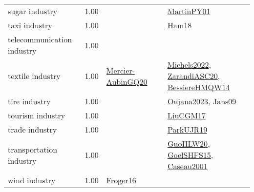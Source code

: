 {\begin{longtable}{p{3cm}r>{\raggedright\arraybackslash}p{6cm}>{\raggedright\arraybackslash}p{6cm}>{\raggedright\arraybackslash}p{8cm}}
\index{sugar industry}\index{Industries!sugar industry}sugar industry &  1.00 &  &  & \hyperref[detail:MartinPY01]{MartinPY01}\\
\index{taxi industry}\index{Industries!taxi industry}taxi industry &  1.00 &  &  & \hyperref[detail:Ham18]{Ham18}\\
\index{telecommunication industry}\index{Industries!telecommunication industry}telecommunication industry &  1.00 &  &  & \\
\index{textile industry}\index{Industries!textile industry}textile industry &  1.00 & \hyperref[detail:Mercier-AubinGQ20]{Mercier-AubinGQ20} &  & \hyperref[detail:Michels2022]{Michels2022}, \hyperref[detail:ZarandiASC20]{ZarandiASC20}, \hyperref[detail:BessiereHMQW14]{BessiereHMQW14}\\
\index{tire industry}\index{Industries!tire industry}tire industry &  1.00 &  &  & \hyperref[detail:Oujana2023]{Oujana2023}, \hyperref[detail:Jans09]{Jans09}\\
\index{tourism industry}\index{Industries!tourism industry}tourism industry &  1.00 &  &  & \hyperref[detail:LiuCGM17]{LiuCGM17}\\
\index{trade industry}\index{Industries!trade industry}trade industry &  1.00 &  &  & \hyperref[detail:ParkUJR19]{ParkUJR19}\\
\index{transportation industry}\index{Industries!transportation industry}transportation industry &  1.00 &  &  & \hyperref[detail:GuoHLW20]{GuoHLW20}, \hyperref[detail:GoelSHFS15]{GoelSHFS15}, \hyperref[detail:Caseau2001]{Caseau2001}\\
\index{wind industry}\index{Industries!wind industry}wind industry &  1.00 & \hyperref[detail:Froger16]{Froger16} &  & \\
\end{longtable}
}

\clearpage
